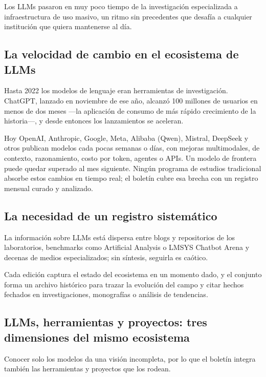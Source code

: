 \documentclass[conference,twocolumn,spanish]{IEEEtran}
\begin{document}
Los LLMs pasaron en muy poco tiempo de la investigación especializada a
infraestructura de uso masivo, un ritmo sin precedentes que desafía a
cualquier institución que quiera mantenerse al día.

\subsection{La velocidad de cambio en el ecosistema de LLMs}

Hasta 2022 los modelos de lenguaje eran herramientas de investigación.
ChatGPT, lanzado en noviembre de ese año, alcanzó 100 millones de usuarios
en menos de dos meses ---la aplicación de consumo de más rápido
crecimiento de la historia---, y desde entonces los lanzamientos se
aceleran.

Hoy OpenAI, Anthropic, Google, Meta, Alibaba (Qwen), Mistral, DeepSeek y
otros publican modelos cada pocas semanas o días, con mejoras
multimodales, de contexto, razonamiento, costo por token, agentes o APIs.
Un modelo de frontera puede quedar superado al mes siguiente.
Ningún programa de estudios tradicional absorbe estos cambios en tiempo
real; el boletín cubre esa brecha con un registro mensual curado y
analizado.

\subsection{La necesidad de un registro sistemático}

La información sobre LLMs está dispersa entre blogs y repositorios de los
laboratorios, benchmarks como Artificial Analysis o LMSYS Chatbot Arena y
decenas de medios especializados; sin síntesis, seguirla es caótico.

Cada edición captura el estado del ecosistema en un momento dado, y el
conjunto forma un archivo histórico para trazar la evolución del campo y
citar hechos fechados en investigaciones, monografías o análisis de
tendencias.

\subsection{LLMs, herramientas y proyectos: tres dimensiones del mismo ecosistema}

Conocer solo los modelos da una visión incompleta, por lo que el boletín
integra también las herramientas y proyectos que los rodean.
\end{document}
